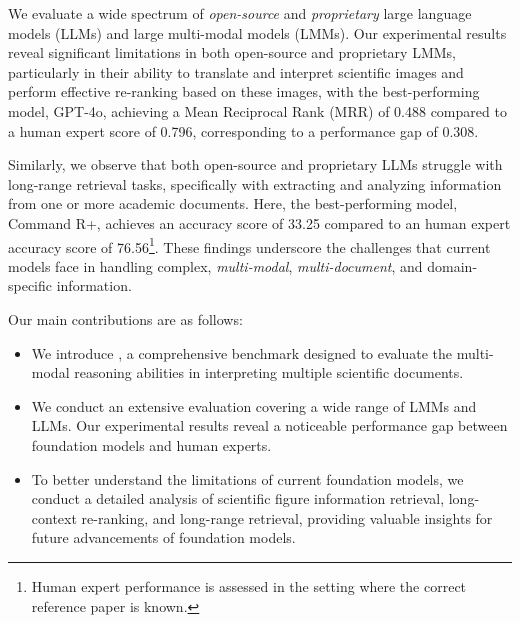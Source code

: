 We evaluate a wide spectrum of \emph{open-source} and \emph{proprietary} large language models (LLMs) and large multi-modal models (LMMs). 
Our experimental results reveal significant limitations in both open-source and proprietary LMMs, particularly in their ability to translate and interpret scientific images and perform effective re-ranking based on these images, with the best-performing model, GPT-4o, achieving a Mean Reciprocal Rank (MRR) of 0.488 compared to a human expert score of 0.796, corresponding to a performance gap of 0.308. 

Similarly, we observe that both open-source and proprietary LLMs struggle with long-range retrieval tasks,
%
specifically with extracting and analyzing information from one or more academic documents. Here, the best-performing model, Command R+, achieves an accuracy score of 33.25 compared to an human expert accuracy score of 76.56\footnote{Human expert performance is assessed in the setting where the correct reference paper is known.}.
These findings underscore the challenges that current models face in handling complex, \emph{multi-modal}, \emph{multi-document}, and domain-specific information. 


Our main contributions are as follows:
\vspace{-0.5em}
\begin{itemize} [leftmargin=*]
\itemsep0em 
\item We introduce \data, a comprehensive benchmark designed to evaluate the multi-modal reasoning abilities in interpreting multiple scientific documents. 
%
\item We conduct an extensive evaluation covering a wide range of LMMs and LLMs. Our experimental results reveal a noticeable performance gap between foundation models and human experts. 
%
\item To better understand the limitations of current foundation models, we conduct a detailed analysis of scientific figure information retrieval, long-context re-ranking, and long-range retrieval, providing valuable insights for future advancements of foundation models.
\end{itemize}

